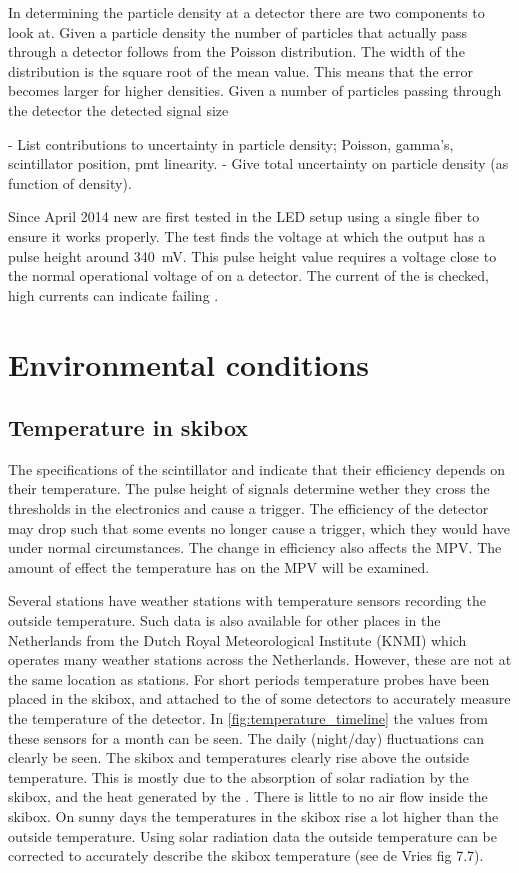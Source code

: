 In determining the particle density at a detector there are two components to look at. Given a particle density the number of particles that actually pass through a detector follows from the Poisson distribution. The width of the distribution is the square root of the mean value. This means that the error becomes larger for higher densities. Given a number of particles passing through the detector the detected signal size

- List contributions to uncertainty in particle density; Poisson, gamma's, scintillator position, pmt linearity.
- Give total uncertainty on particle density (as function of density).

Since April 2014 new \pmts are first tested in the LED setup using a single fiber to ensure it works properly. The test finds the voltage at which the output has a pulse height around \SI{340}{\milli\volt}. This pulse height value requires a voltage close to the normal operational voltage of \pmts on a \hisparc detector. The current of the \pmt is checked, high currents can indicate failing \pmts.


\section{Environmental conditions}
\label{sec:detector-environmental}

\subsection{Temperature in skibox}

The specifications of the scintillator and \pmt indicate that their efficiency depends on their temperature. The pulse height of signals determine wether they cross the thresholds in the electronics and cause a trigger. The efficiency of the detector may drop such that some events no longer cause a trigger, which they would have under normal circumstances. The change in efficiency also affects the MPV. The amount of effect the temperature has on the MPV will be examined.

Several \hisparc stations have weather stations with temperature sensors recording the outside temperature. Such data is also available for other places in the Netherlands from the Dutch Royal Meteorological Institute (KNMI) which operates many weather stations across the Netherlands. However, these are not at the same location as \hisparc stations. For short periods temperature probes have been placed in the skibox, and attached to the \pmt of some detectors to accurately measure the temperature of the detector. In \cref{fig:temperature_timeline} the values from these sensors for a month can be seen. The daily (night/day) fluctuations can clearly be seen. The skibox and \pmt temperatures clearly rise above the outside temperature. This is mostly due to the absorption of solar radiation by the skibox, and the heat generated by the \pmt. There is little to no air flow inside the skibox. On sunny days the temperatures in the skibox rise a lot higher than the outside temperature. Using solar radiation data the outside temperature can be corrected to accurately describe the skibox temperature (see de Vries fig 7.7).

